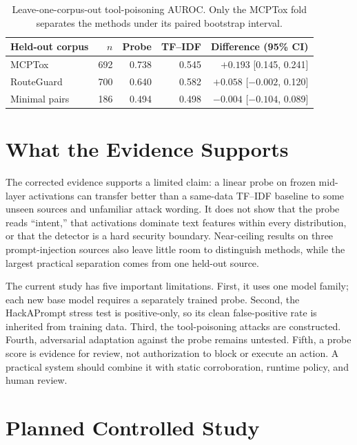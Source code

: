 \documentclass[10pt]{article}
\begin{document}
\begin{table}[h]
\centering
\small
\begin{tabular}{@{}lrrrr@{}}
\toprule
Held-out corpus & $n$ & Probe & TF--IDF & Difference (95\% CI) \\
\midrule
MCPTox     & 692 & 0.738 & 0.545 & $+0.193$ [0.145, 0.241] \\
RouteGuard & 700 & 0.640 & 0.582 & $+0.058$ [$-0.002$, 0.120] \\
Minimal pairs & 186 & 0.494 & 0.498 & $-0.004$ [$-0.104$, 0.089] \\
\bottomrule
\end{tabular}
\caption{Leave-one-corpus-out tool-poisoning AUROC. Only the MCPTox fold separates the methods under its paired bootstrap interval.}
\label{tab:tools}
\end{table}

\section{What the Evidence Supports}

The corrected evidence supports a limited claim: a linear probe on frozen mid-layer activations can transfer better than a same-data TF--IDF baseline to some unseen sources and unfamiliar attack wording. It does not show that the probe reads ``intent,'' that activations dominate text features within every distribution, or that the detector is a hard security boundary. Near-ceiling results on three prompt-injection sources also leave little room to distinguish methods, while the largest practical separation comes from one held-out source.

The current study has five important limitations. First, it uses one model family; each new base model requires a separately trained probe. Second, the HackAPrompt stress test is positive-only, so its clean false-positive rate is inherited from training data. Third, the tool-poisoning attacks are constructed. Fourth, adversarial adaptation against the probe remains untested. Fifth, a probe score is evidence for review, not authorization to block or execute an action. A practical system should combine it with static corroboration, runtime policy, and human review.

\section{Planned Controlled Study}
\end{document}
